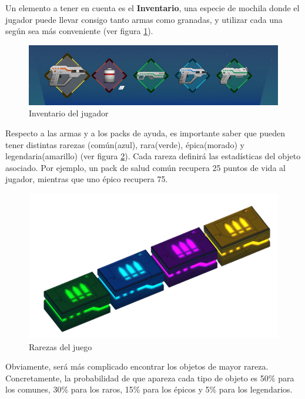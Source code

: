 Un elemento a tener en cuenta es el \textbf{Inventario}, una especie de mochila donde el jugador puede llevar consigo tanto armas como granadas, y utilizar cada una según sea más conveniente (ver figura \ref{fig:Inventario}).

\begin{figure}[h]
    \centering
    \includegraphics[scale=0.45]{img/InventoryInterface.jpg}
    \caption{Inventario del jugador}
    \label{fig:Inventario}
    \end{figure}

Respecto a las armas y a los packs de ayuda, es importante saber que pueden tener distintas rarezas (común(azul), rara(verde), épica(morado) y legendaria(amarillo) (ver figura \ref{fig:Rarezas}). Cada rareza definirá las estadísticas del objeto asociado. Por ejemplo, un pack de salud común recupera 25 puntos de vida al jugador, mientras que uno épico recupera 75.

\begin{figure}[h]
    \centering
    \includegraphics[scale=0.45]{img/Packs.png}
    \caption{Rarezas del juego}
    \label{fig:Rarezas}
    \end{figure}

Obviamente, será más complicado encontrar los objetos de mayor rareza. Concretamente, la probabilidad de que apareza cada tipo de objeto es 50\% para los comunes, 30\% para los raros, 15\% para los épicos y 5\% para los legendarios.

